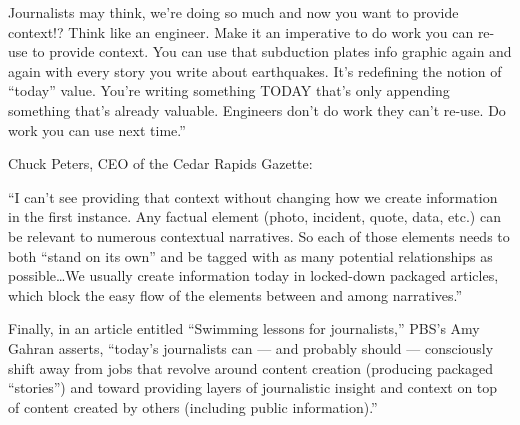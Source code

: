 Journalists may think, we’re doing so much and now you want to provide context!? Think like an engineer. Make it an imperative to do work you can re-use to provide context. You can use that subduction plates info graphic again and again with every story you write about earthquakes. It’s redefining the notion of “today” value. You’re writing something TODAY that’s only appending something that’s already valuable. Engineers don’t do work they can’t re-use. Do work you can use next time.''

Chuck Peters, CEO of the Cedar Rapids Gazette:

``I can’t see providing that context without changing how we create information in the first instance. Any factual element (photo, incident, quote, data, etc.) can be relevant to numerous contextual narratives. So each of those elements needs to both “stand on its own” and be tagged with as many potential relationships as possible\ldots We usually create information today in locked-down packaged articles, which block the easy flow of the elements between and among narratives.''

Finally, in an article entitled ``Swimming lessons for journalists,'' PBS's Amy Gahran asserts, ``today’s journalists can — and probably should — consciously shift away from jobs that revolve around content creation (producing packaged “stories”) and toward providing layers of journalistic insight and context on top of content created by others (including public information).''



